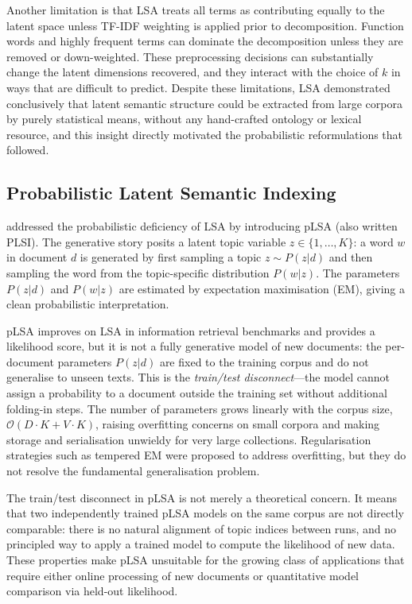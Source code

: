 \documentclass[11pt,a4paper]{article}
\begin{document}
Another limitation is that LSA treats all terms as contributing
equally to the latent space unless TF-IDF weighting is applied prior
to decomposition.
Function words and highly frequent terms can dominate the decomposition
unless they are removed or down-weighted.
These preprocessing decisions can substantially change the latent
dimensions recovered, and they interact with the choice of $k$ in
ways that are difficult to predict.
Despite these limitations, LSA demonstrated conclusively that latent
semantic structure could be extracted from large corpora by purely
statistical means, without any hand-crafted ontology or lexical
resource, and this insight directly motivated the probabilistic
reformulations that followed.

\subsection{Probabilistic Latent Semantic Indexing}
\label{sec:plsa}

\textcite{hofmann1999probabilistic} addressed the probabilistic
deficiency of LSA by introducing pLSA (also written PLSI).
The generative story posits a latent topic variable $z \in
\{1,\ldots,K\}$: a word $w$ in document $d$ is generated by first
sampling a topic $z \sim P(z|d)$ and then sampling the word from the
topic-specific distribution $P(w|z)$.
The parameters $P(z|d)$ and $P(w|z)$ are estimated by expectation
maximisation (EM), giving a clean probabilistic interpretation.

pLSA improves on LSA in information retrieval benchmarks and provides
a likelihood score, but it is not a fully generative model of new
documents: the per-document parameters $P(z|d)$ are fixed to the
training corpus and do not generalise to unseen texts.
This is the \emph{train/test disconnect}---the model cannot assign a
probability to a document outside the training set without additional
folding-in steps.
The number of parameters grows linearly with the corpus size,
$\mathcal{O}(D \cdot K + V \cdot K)$, raising overfitting concerns
on small corpora and making storage and serialisation unwieldy for
very large collections.
Regularisation strategies such as tempered EM were proposed to
address overfitting, but they do not resolve the fundamental
generalisation problem.

The train/test disconnect in pLSA is not merely a theoretical concern.
It means that two independently trained pLSA models on the same corpus
are not directly comparable: there is no natural alignment of topic
indices between runs, and no principled way to apply a trained model
to compute the likelihood of new data.
These properties make pLSA unsuitable for the growing class of
applications that require either online processing of new documents or
quantitative model comparison via held-out likelihood.
\end{document}
